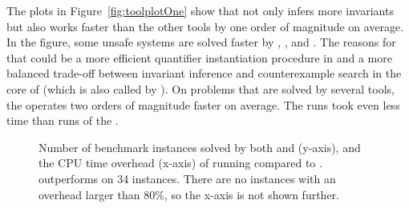 The plots in Figure~\ref{fig:toolplotOne} show that \ringen{\cvc{}} not only infers more invariants but also works faster than the other tools by one order of magnitude on average. In the figure, some unsafe systems are solved faster by \cvcind{}, \vericat{}, and \racer{}. The reasons for that could be a more efficient quantifier instantiation procedure in \cvcind{} and a more balanced trade-off between invariant inference and counterexample search in the core of \racer{} (which is also called by \vericat{}).
On problems that are solved by several tools, the \ringen{\cvc} operates two orders of magnitude faster on average.
The \ringen{\vampire{}} runs took even less time than runs of the \ringen{\cvc}.

\begin{figure}
    \pgfmathsetmacro\NRows{\pgfplotsretval}
        \centering
    \caption{ Number of benchmark instances solved by both \theringenCICI{} and \racer{} (y-axis), and the CPU time overhead (x-axis) of running \theringenCICI{} compared to \racer{}. \racer{} outperforms \theringenCICI{} on 34 instances. There are no instances with an overhead larger than 80\%, so the x-axis is not shown further.}
    \label{fig:performance}
\end{figure}

